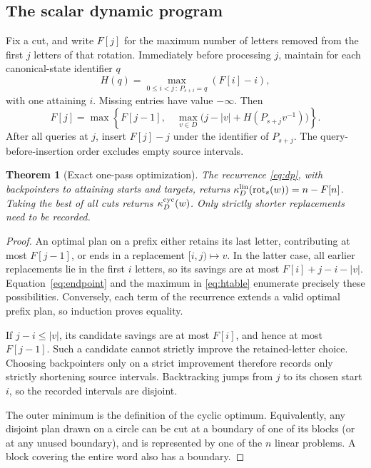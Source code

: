 \documentclass[11pt,a4paper]{article}
\newtheorem{theorem}{Theorem}[section]
\theoremstyle{definition}\newtheorem{definition}[theorem]{Definition}
\theoremstyle{remark}\newtheorem{remark}[theorem]{Remark}
\newcommand{\rot}{\operatorname{rot}}
\begin{document}
\subsection{The scalar dynamic program}
Fix a cut, and write $F[j]$ for the maximum number of letters removed from
the first $j$ letters of that rotation. Immediately before processing $j$,
maintain for each canonical-state identifier $q$
\begin{equation}\label{eq:htable}
 H(q)=\max_{0\le i<j\, :\, P_{s+i}=q}(F[i]-i),
\end{equation}
with one attaining $i$. Missing entries have value $-\infty$. Then
\begin{equation}\label{eq:dp}
 F[j]=\max\left\{F[j-1],\quad
 \max_{v\in D}\bigl(j-|v|+H(P_{s+j}v^{-1})\bigr)\right\}.
\end{equation}
After all queries at $j$, insert $F[j]-j$ under the identifier of $P_{s+j}$.
The query-before-insertion order excludes empty source intervals.

\begin{theorem}[Exact one-pass optimization]\label{thm:optimal}
The recurrence \eqref{eq:dp}, with backpointers to attaining starts and
targets, returns $\kappa_D^{\rm lin}(\rot_s(w))=n-F[n]$. Taking the best
of all cuts returns $\kappa_D^{\rm cyc}(w)$. Only strictly shorter
replacements need to be recorded.
\end{theorem}
\begin{proof}
An optimal plan on a prefix either retains its last letter, contributing at
most $F[j-1]$, or ends in a replacement $[i,j)\mapsto v$. In the latter case,
all earlier replacements lie in the first $i$ letters, so its savings are
at most $F[i]+j-i-|v|$. Equation~\eqref{eq:endpoint} and the maximum in
\eqref{eq:htable} enumerate precisely these possibilities. Conversely, each
term of the recurrence extends a valid optimal prefix plan, so induction
proves equality.

If $j-i\le|v|$, its candidate savings are at most $F[i]$, and hence at most
$F[j-1]$. Such a candidate cannot strictly improve the retained-letter
choice. Choosing backpointers only on a strict improvement therefore records
only strictly shortening source intervals. Backtracking jumps from $j$ to
its chosen start $i$, so the recorded intervals are disjoint.

The outer minimum is the definition of the cyclic optimum. Equivalently,
any disjoint plan drawn on a circle can be cut at a boundary of one of its
blocks (or at any unused boundary), and is represented by one of the $n$
linear problems. A block covering the entire word also has a boundary.
\end{proof}
\end{document}
